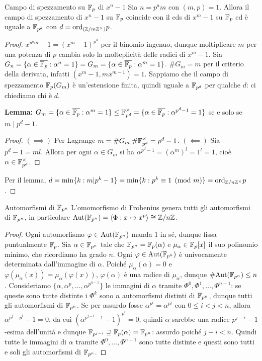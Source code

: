 \begin{theorem}{Campo di spezzamento su $\mathbb{F}_p$ di $x^n - 1$}
    Sia $n = p^a m$ con $(m, p) = 1$. Allora il campo di spezzamento di $x^n - 1$ su $\mathbb{F}_p$ coincide con il cds di $x^m - 1$ su $\mathbb{F}_p$ ed è uguale a $\mathbb{F}_{p^d}$ con $d = \text{ord}_{(\mathbb{Z}/m\mathbb{Z}^\times)}p$.
\end{theorem}
\begin{proof}
    $x^{p^a m} - 1 = (x^m - 1)^{p^a}$ per il binomio ingenuo, dunque moltiplicare $m$ per una potenza di $p$ cambia solo la molteplicità delle radici di $x^m - 1$. Sia $G_n = \{ \alpha \in \overline{\mathbb{F}_p} : \alpha^n = 1 \} = G_m = \{ \alpha \in \overline{\mathbb{F}_p} : \alpha^m = 1 \}$. $\# G_m = m$ per il criterio della derivata, infatti $(x^m - 1, mx^{m-1}) = 1$. Sappiamo che il campo di spezzamento $\mathbb{F}_p(G_m)$ è un'estensione finita, quindi uguale a $\mathbb{F}_{p^d}$ per qualche $d$: ci chiediamo chi è $d$.

    \textbf{Lemma:} $G_m = \{ \alpha \in \overline{\mathbb{F}_p} : \alpha^m = 1 \} \le \mathbb{F}_{p^d}^\times = \{ \alpha \in \overline{\mathbb{F}_p} : \alpha^{p^d - 1} = 1 \}$ se e solo se $m \mid p^d - 1$.
    \begin{proof}
        $(\implies)$ Per Lagrange $m = \#G_m | \#\mathbb{F}_{p^d}^\times = p^d - 1$.
        $(\impliedby)$ Sia $p^d - 1 = m l$. Allora per ogni $\alpha \in G_m$ si ha $\alpha^{p^d - 1} = (\alpha^m)^l = 1^l = 1$, cioè $\alpha \in \mathbb{F}_{p^d}^\times$.
    \end{proof}
    
    Per il lemma, $d = \min \{ k : m | p^k - 1 \} = \min \{ k : p^k \equiv 1 \pmod{m} \} = \text{ord}_{\mathbb{Z}/n\mathbb{Z}^\times}p$.
\end{proof}

\begin{theorem}{Automorfismi di $\mathbb{F}_{p^n}$}
    L'omomorfismo di Frobenius genera tutti gli automorfismi di $\mathbb{F}_{p^n}$, in particolare $\text{Aut}(\mathbb{F}_{p^n}) = \langle \Phi: x \mapsto x^p \rangle \cong \mathbb{Z}/n\mathbb{Z}$.
\end{theorem}
\begin{proof}
    Ogni automorfismo $\varphi \in \text{Aut}(\mathbb{F}_{p^n})$ manda $1$ in sé, dunque fissa puntualmente $\mathbb{F}_p$. Sia $\alpha \in \mathbb{F}_{p^n}$ tale che $\mathbb{F}_{p^n} = \mathbb{F}_p(\alpha)$ e $\mu_\alpha \in \mathbb{F}_p[x]$ il suo polinomio minimo, che ricordiamo ha grado $n$. Ogni $\varphi \in \text{Aut}(\mathbb{F}_{p^n})$ è univocamente determinata dall'immagine di $\alpha$. Poiché $\mu_\alpha(\alpha) = 0$ e $\varphi(\mu_\alpha(x)) = \mu_\alpha(\varphi(x))$, $\varphi(\alpha)$ è una radice di $\mu_\alpha$, dunque $\#\text{Aut}(\mathbb{F}_{p^n}) \le n$. Consideriamo $\{ \alpha, \alpha^p, \dots, \alpha^{p^{n-1}} \}$ le immagini di $\alpha$ tramite $\Phi^0, \Phi^1, \dots, \Phi^{n - 1}$: se queste sono tutte distinte i $\Phi^k$ sono $n$ automorfismi distinti di $\mathbb{F}_{p^n}$, dunque tutti gli automorfismi di $\mathbb{F}_{p^n}$. Se per assurdo fosse $\alpha^{p^i} = \alpha^{p^j}$ con $0 \le i < j < n$, allora $\alpha^{p^j - p^i} - 1 = 0$, da cui $(\alpha^{p^{j - i} - 1} - 1)^{p^i} = 0$, quindi $\alpha$ sarebbe una radice $p^{j-i} - 1$-esima dell'unità e dunque $\mathbb{F}_{p^{j-i}} \supseteq\mathbb{F}_p(\alpha) =\mathbb{F}_{p^n} $: assurdo poiché $j - i < n$. Quindi tutte le immagini di $\alpha$ tramite $\Phi^0, \dots, \Phi^{n-1}$ sono tutte distinte e questi sono tutti e soli gli automorfismi di $\mathbb{F}_{p^n}$.
\end{proof}

